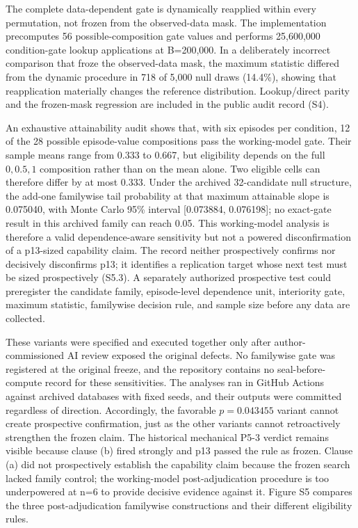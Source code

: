 \documentclass[11pt]{article}
\begin{document}
The complete data-dependent gate is dynamically reapplied within every
permutation, not frozen from the observed-data mask. The implementation
precomputes 56 possible-composition gate values and performs 25,600,000
condition-gate lookup applications at B=200,000. In a deliberately
incorrect comparison that froze the observed-data mask, the maximum
statistic differed from the dynamic procedure in 718 of 5,000 null draws
(14.4\%), showing that reapplication materially changes the reference
distribution. Lookup/direct parity and the frozen-mask regression are
included in the public audit record (S4).

An exhaustive attainability audit shows that, with six episodes per
condition, 12 of the 28 possible episode-value compositions pass the
working-model gate. Their sample means range from 0.333 to 0.667, but
eligibility depends on the full \({0,0.5,1}\) composition rather than on
the mean alone. Two eligible cells can therefore differ by at most
0.333. Under the archived 32-candidate null structure, the add-one
familywise tail probability at that maximum attainable slope is
0.075040, with Monte Carlo 95\% interval {[}0.073884, 0.076198{]}; no
exact-gate result in this archived family can reach 0.05. This
working-model analysis is therefore a valid dependence-aware sensitivity
but not a powered disconfirmation of a p13-sized capability claim. The
record neither prospectively confirms nor decisively disconfirms p13; it
identifies a replication target whose next test must be sized
prospectively (S5.3). A separately authorized prospective test could
preregister the candidate family, episode-level dependence unit,
interiority gate, maximum statistic, familywise decision rule, and
sample size before any data are collected.

These variants were specified and executed together only after
author-commissioned AI review exposed the original defects. No
familywise gate was registered at the original freeze, and the
repository contains no seal-before-compute record for these
sensitivities. The analyses ran in GitHub Actions against archived
databases with fixed seeds, and their outputs were committed regardless
of direction. Accordingly, the favorable \(p=0.043455\) variant cannot
create prospective confirmation, just as the other variants cannot
retroactively strengthen the frozen claim. The historical mechanical
P5-3 verdict remains visible because clause (b) fired strongly and p13
passed the rule as frozen. Clause (a) did not prospectively establish
the capability claim because the frozen search lacked family control;
the working-model post-adjudication procedure is too underpowered at n=6
to provide decisive evidence against it. Figure S5 compares the three
post-adjudication familywise constructions and their different
eligibility rules.
\end{document}
